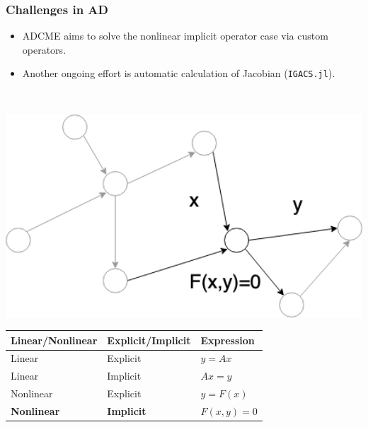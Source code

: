 \documentclass{beamer}
\begin{document}
\begin{frame}
	\frametitle{Challenges in AD}
	
	
	\begin{minipage}[t]{0.49\textwidth}
	\vspace{-3cm}
\begin{itemize}
	\item ADCME aims to solve the nonlinear implicit operator case via custom operators. 
	\item Another ongoing effort is automatic calculation of Jacobian (\texttt{IGACS.jl}).
\end{itemize}
\end{minipage}~
\begin{minipage}[t]{0.49\textwidth}
  \includegraphics[width=1.0\textwidth]{../sim.png}
\end{minipage}

\begin{table}[]
\begin{tabular}{@{}lll@{}}
\toprule
Linear/Nonlinear & Explicit/Implicit & Expression   \\ \midrule
Linear           & Explicit          & $y=Ax$       \\
Linear           & Implicit          & $Ax = y$     \\
Nonlinear        & Explicit          & $y = F(x)$   \\
\textbf{Nonlinear}        & \textbf{Implicit}          & $F(x,y) = 0$ \\ \bottomrule
\end{tabular}
\end{table}






\end{frame}
\end{document}
